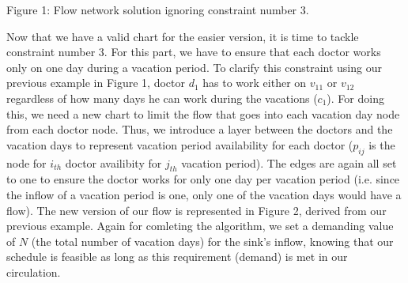 \vspace*{1cm}
{\centering {} \par}
{\centering Figure 1: Flow network solution ignoring constraint number 3.\par}

Now that we have a valid chart for the easier version, it is time to tackle constraint number 3. For this part,
we have to ensure that each doctor works only on one day during a vacation period. To clarify this constraint using our previous example in Figure 1,
doctor $d_1$ has to work either on $v_{11}$ or $v_{12}$ regardless of how many days he can work during the vacations ($c_1$). For doing this, we need 
a new chart to limit the flow that goes into each vacation day node from each doctor node. Thus, we introduce a layer between the doctors and the vacation days
to represent vacation period availability for each doctor ($p_{ij}$ is the node for $i_{th}$ doctor availibity for $j_{th}$ vacation period). The edges are again all set
to one to ensure the doctor works for only one day per vacation period (i.e. since the inflow of a vacation period is one, only one of the
vacation days would have a flow). The new version of our flow is represented in Figure 2, derived from our previous example. 
Again for comleting the algorithm, we set a demanding value of $N$ (the total number of vacation days) for the sink's inflow, knowing that our schedule is feasible as long as this
requirement (demand) is met in our circulation.


